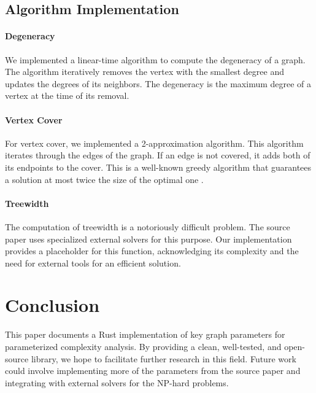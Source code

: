 \documentclass{article}
\begin{document}
\subsection{Algorithm Implementation}
\paragraph{Degeneracy} We implemented a linear-time algorithm to compute the degeneracy of a graph. The algorithm iteratively removes the vertex with the smallest degree and updates the degrees of its neighbors. The degeneracy is the maximum degree of a vertex at the time of its removal.

\paragraph{Vertex Cover} For vertex cover, we implemented a 2-approximation algorithm. This algorithm iterates through the edges of the graph. If an edge is not covered, it adds both of its endpoints to the cover. This is a well-known greedy algorithm that guarantees a solution at most twice the size of the optimal one \cite{bafna1999}.

\paragraph{Treewidth} The computation of treewidth is a notoriously difficult problem. The source paper \cite{komusiewicz2025parameter} uses specialized external solvers for this purpose. Our implementation provides a placeholder for this function, acknowledging its complexity and the need for external tools for an efficient solution.

\section{Conclusion}
This paper documents a Rust implementation of key graph parameters for parameterized complexity analysis. By providing a clean, well-tested, and open-source library, we hope to facilitate further research in this field. Future work could involve implementing more of the parameters from the source paper and integrating with external solvers for the NP-hard problems.



\end{document}
